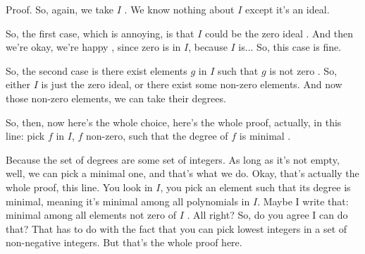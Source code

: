\begin{content}
\end{content}

\begin{proofWrapper}

\begin{speech}[00:32:22 - 00:34:07]
Proof.  So, again, we take $I$ . We know nothing about $I$ except it's an ideal.

So, the first case, which is annoying, is that $I$ could be the zero ideal . And then we're okay, we're happy , since zero is in $I$, because $I$ is... So, this case is fine.

So, the second case is there exist elements $g$ in $I$ such that $g$ is not zero . So, either $I$ is just the zero ideal, or there exist some non-zero elements. And now those non-zero elements, we can take their degrees.

So, then, now here's the whole choice, here's the whole proof, actually, in this line: pick $f$ in $I$, $f$ non-zero, such that the degree of $f$ is minimal .

Because the set of degrees are some set of integers. As long as it's not empty, well, we can pick a minimal one, and that's what we do. Okay, that's actually the whole proof, this line. You look in $I$, you pick an element such that its degree is minimal, meaning it's minimal among all polynomials in $I$. Maybe I write that: minimal among all elements not zero of $I$ . All right? So, do you agree I can do that? That has to do with the fact that you can pick lowest integers in a set of non-negative integers. But that's the whole proof here.
\end{speech}


\end{proofWrapper}
